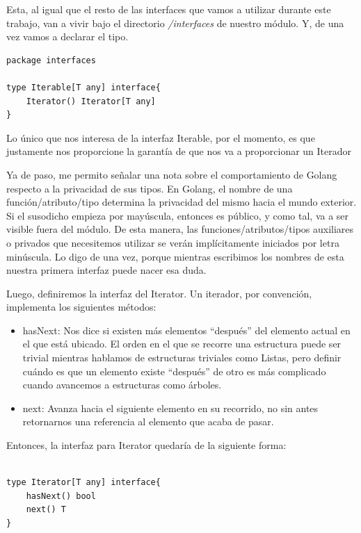 \documentclass[11pt]{article}
\begin{document}
Esta, al igual que el resto de las interfaces que vamos a utilizar durante este trabajo, van a vivir bajo el directorio \emph{/interfaces} de nuestro módulo. Y, de una vez vamos a declarar el tipo.

\begin{verbatim}
package interfaces

type Iterable[T any] interface{
	Iterator() Iterator[T any]
}

\end{verbatim}

Lo único que nos interesa de la interfaz Iterable, por el momento, es que justamente nos proporcione la garantía de que nos va a proporcionar un Iterador

Ya de paso, me permito señalar una nota sobre el comportamiento de Golang respecto a la privacidad de sus tipos.
En Golang, el nombre de una función/atributo/tipo determina la privacidad del mismo hacia el mundo exterior. Si el susodicho empieza por mayúscula, entonces es público, y como tal, va a ser visible fuera del módulo. De esta manera, las funciones/atributos/tipos auxiliares o privados que necesitemos utilizar se verán implícitamente iniciados por letra minúscula. Lo digo de una vez, porque mientras escribimos los nombres de esta nuestra primera interfaz puede nacer esa duda.

Luego, definiremos la interfaz del Iterator. Un iterador, por convención, implementa los siguientes métodos:

\begin{itemize}
\item hasNext: Nos dice si existen más elementos ``después'' del elemento actual en el que está ubicado. El orden en el que se recorre una estructura puede ser trivial mientras hablamos de estructuras triviales como Listas, pero definir cuándo es que un elemento existe ``después'' de otro es más complicado cuando avancemos a estructuras como árboles.

\item next: Avanza hacia el siguiente elemento en su recorrido, no sin antes retornarnos una referencia al elemento que acaba de pasar.
\end{itemize}

Entonces, la interfaz para Iterator quedaría de la siguiente forma:

\begin{verbatim}

type Iterator[T any] interface{
	hasNext() bool
	next() T
}

\end{verbatim}
\end{document}
